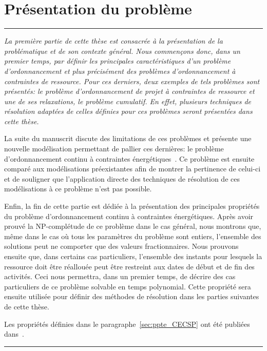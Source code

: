 \cleardoublepage
\begin{minipage}{0.95\linewidth}
  \part{Présentation du problème}
  \vspace{15mm} %
  \parttoc 

\end{minipage}

\newpage
\thispagestyle{empty}
\begin{center}
  \begin{minipage}{\textwidth}
    \hrule
    \vspace{0.5cm}
    {\it  La première partie de cette thèse est consacrée à la présentation de
      la problématique et de son contexte général. Nous commençons donc,
    dans un premier temps, par définir les principales caractéristiques
    d'un problème d'ordonnancement et plus précisément des problèmes
    d'ordonnancement à contraintes de ressource. Pour ces derniers,
    deux exemples de tels problèmes sont présentés: le problème
    d'ordonnancement de projet à contraintes de ressource et une de ses relaxations, le
    problème cumulatif. En effet, plusieurs techniques de résolution
    adaptées de celles définies pour ces problèmes seront présentées
    dans cette thèse. 

    La suite du manuscrit discute des limitations de ces problèmes
    et présente une nouvelle modélisation permettant de pallier ces
    dernières: le problème d'ordonnancement continu à contraintes
    énergétiques~\cite{ArtiguesLopez,Nattaf_ORSpectrum,Nattaf_Constraints}. Ce
    problème est ensuite comparé aux modélisations préexistantes afin de
    montrer la pertinence de celui-ci et de souligner que l'application
    directe des techniques de résolution de ces modélisations à ce
    problème n'est pas possible.

    Enfin, la fin de cette partie est dédiée à la présentation des
    principales propriétés du problème d'ordonnancement continu à
    contraintes énergétiques. Après avoir prouvé la NP-complétude de ce
    problème dans le cas général, nous montrons que, même dans le cas où
    tous les paramètres du problème sont entiers, l'ensemble des solutions
    peut ne comporter que des valeurs fractionnaires. Nous prouvons
    ensuite que, dans certains cas particuliers, l'ensemble des instants
    pour lesquels la ressource doit être réallouée peut être
    restreint aux dates de début et de fin des activités. Ceci nous
    permettra, dans un premier temps, de décrire des cas particuliers
    de ce problème solvable en temps polynomial. Cette propriété sera
    ensuite utilisée pour définir des méthodes de résolution dans les
    parties suivantes de cette thèse. 

    Les propriétés définies dans le paragraphe~\ref{sec:ppte_CECSP}
    ont été publiées
    dans~\cite{Nattaf_ORSpectrum,Nattaf_Constraints,Nattaf_CPDP}.} 
    \vspace{0.5cm}
    \hrule
  \end{minipage}
\end{center}

